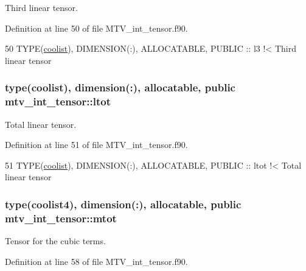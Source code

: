 Third linear tensor. 



Definition at line 50 of file M\+T\+V\+\_\+int\+\_\+tensor.\+f90.


\begin{DoxyCode}
50   \textcolor{keywordtype}{TYPE}(\hyperlink{structtensor_1_1coolist}{coolist}), \textcolor{keywordtype}{DIMENSION(:)}, \textcolor{keywordtype}{ALLOCATABLE}, \textcolor{keywordtype}{PUBLIC} :: l3\textcolor{comment}{   !< Third linear tensor}
\end{DoxyCode}
\subsubsection[{\texorpdfstring{ltot}{ltot}}]{\setlength{\rightskip}{0pt plus 5cm}type({\bf coolist}), dimension(\+:), allocatable, public mtv\+\_\+int\+\_\+tensor\+::ltot}\hypertarget{namespacemtv__int__tensor_ace2795d6c48885b8f847384747e8ad5d}{}\label{namespacemtv__int__tensor_ace2795d6c48885b8f847384747e8ad5d}


Total linear tensor. 



Definition at line 51 of file M\+T\+V\+\_\+int\+\_\+tensor.\+f90.


\begin{DoxyCode}
51   \textcolor{keywordtype}{TYPE}(\hyperlink{structtensor_1_1coolist}{coolist}), \textcolor{keywordtype}{DIMENSION(:)}, \textcolor{keywordtype}{ALLOCATABLE}, \textcolor{keywordtype}{PUBLIC} :: ltot\textcolor{comment}{ !< Total linear tensor}
\end{DoxyCode}
\subsubsection[{\texorpdfstring{mtot}{mtot}}]{\setlength{\rightskip}{0pt plus 5cm}type({\bf coolist4}), dimension(\+:), allocatable, public mtv\+\_\+int\+\_\+tensor\+::mtot}\hypertarget{namespacemtv__int__tensor_a3722af69dcc509f4e7d24f898a7e68ae}{}\label{namespacemtv__int__tensor_a3722af69dcc509f4e7d24f898a7e68ae}


Tensor for the cubic terms. 



Definition at line 58 of file M\+T\+V\+\_\+int\+\_\+tensor.\+f90.


